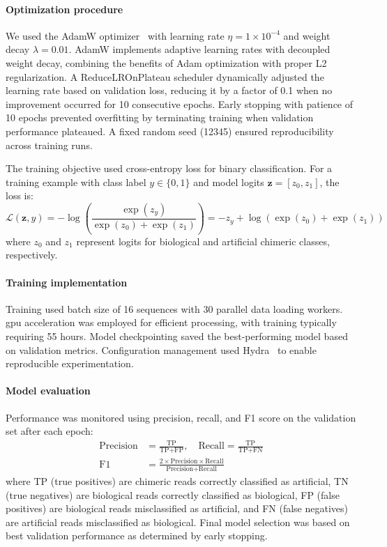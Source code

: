 \documentclass[pdflatex,lineno]{sn-jnl}%
\begin{document}
\paragraph{Optimization procedure}
We used the AdamW optimizer~\cite{loshchilov2017decoupled} with learning rate $\eta = 1 \times 10^{-4}$ and weight decay $\lambda = 0.01$.
AdamW implements adaptive learning rates with decoupled weight decay, combining the benefits of Adam optimization with proper L2 regularization.
A ReduceLROnPlateau scheduler dynamically adjusted the learning rate based on validation loss, reducing it by a factor of 0.1 when no improvement occurred for 10 consecutive epochs.
Early stopping with patience of 10 epochs prevented overfitting by terminating training when validation performance plateaued.
A fixed random seed (12345) ensured reproducibility across training runs.

The training objective used cross-entropy loss for binary classification.
For a training example with class label $y \in \{0,1\}$ and model logits $\mathbf{z} = [z_0, z_1]$, the loss is:
\[
	\mathcal{L}(\mathbf{z}, y) = -\log\left(\frac{\exp(z_y)}{\exp(z_0) + \exp(z_1)}\right) = -z_y + \log(\exp(z_0) + \exp(z_1))
\]
where $z_0$ and $z_1$ represent logits for biological and artificial chimeric classes, respectively.

\paragraph{Training implementation}
Training used batch size of 16 sequences with 30 parallel data loading workers.
\gls{gpu} acceleration was employed for efficient processing, with training typically requiring 55 hours.
Model checkpointing saved the best-performing model based on validation metrics.
Configuration management used Hydra~\cite{Yadan2019Hydra} to enable reproducible experimentation.

\paragraph{Model evaluation}
Performance was monitored using precision, recall, and F1 score on the validation set after each epoch:
\begin{align*}
	\text{Precision} & = \frac{\text{TP}}{\text{TP}+\text{FP}}, \quad
	\text{Recall} = \frac{\text{TP}}{\text{TP}+\text{FN}}                                                        \\
	\text{F1}        & = \frac{2 \times \text{Precision} \times \text{Recall}}{\text{Precision} + \text{Recall}}
\end{align*}
where TP (true positives) are chimeric reads correctly classified as artificial, TN (true negatives) are biological reads correctly classified as biological, FP (false positives) are biological reads misclassified as artificial, and FN (false negatives) are artificial reads misclassified as biological.
Final model selection was based on best validation performance as determined by early stopping.
\end{document}
